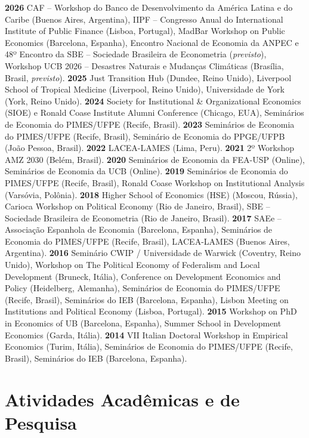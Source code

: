 \documentclass[a4paper,9pt]{article}
\begin{document}
\noindent \textbf{2026} CAF -- Workshop do Banco de Desenvolvimento da América Latina e do Caribe (Buenos Aires, Argentina), IIPF -- Congresso Anual do International Institute of Public Finance (Lisboa, Portugal), MadBar Workshop on Public Economics (Barcelona, Espanha), Encontro Nacional de Economia da ANPEC e 48º Encontro da SBE -- Sociedade Brasileira de Econometria (\emph{previsto}), Workshop UCB 2026 -- Desastres Naturais e Mudanças Climáticas (Brasília, Brasil, \emph{previsto}). \textbf{2025} Just Transition Hub (Dundee, Reino Unido), Liverpool School of Tropical Medicine (Liverpool, Reino Unido), Universidade de York (York, Reino Unido). \textbf{2024} Society for Institutional \& Organizational Economics (SIOE) e Ronald Coase Institute Alumni Conference (Chicago, EUA), Seminários de Economia do PIMES/UFPE (Recife, Brasil). \textbf{2023} Seminários de Economia do PIMES/UFPE (Recife, Brasil), Seminário de Economia do PPGE/UFPB (João Pessoa, Brasil). \textbf{2022} LACEA-LAMES (Lima, Peru). \textbf{2021} 2º Workshop AMZ 2030 (Belém, Brasil). \textbf{2020} Seminários de Economia da FEA-USP (Online), Seminários de Economia da UCB (Online). \textbf{2019} Seminários de Economia do PIMES/UFPE (Recife, Brasil), Ronald Coase Workshop on Institutional Analysis (Varsóvia, Polônia). \textbf{2018} Higher School of Economics (HSE) (Moscou, Rússia), Carioca Workshop on Political Economy (Rio de Janeiro, Brasil), SBE -- Sociedade Brasileira de Econometria (Rio de Janeiro, Brasil). \textbf{2017} SAEe -- Associação Espanhola de Economia (Barcelona, Espanha), Seminários de Economia do PIMES/UFPE (Recife, Brasil), LACEA-LAMES (Buenos Aires, Argentina). \textbf{2016} Seminário CWIP / Universidade de Warwick (Coventry, Reino Unido), Workshop on The Political Economy of Federalism and Local Development (Bruneck, Itália), Conference on Development Economics and Policy (Heidelberg, Alemanha), Seminários de Economia do PIMES/UFPE (Recife, Brasil), Seminários do IEB (Barcelona, Espanha), Lisbon Meeting on Institutions and Political Economy (Lisboa, Portugal). \textbf{2015} Workshop on PhD in Economics of UB (Barcelona, Espanha), Summer School in Development Economics (Garda, Itália). \textbf{2014} VII Italian Doctoral Workshop in Empirical Economics (Turim, Itália), Seminários de Economia do PIMES/UFPE (Recife, Brasil), Seminários do IEB (Barcelona, Espanha).

\section{Atividades Acadêmicas e de Pesquisa}
\end{document}
